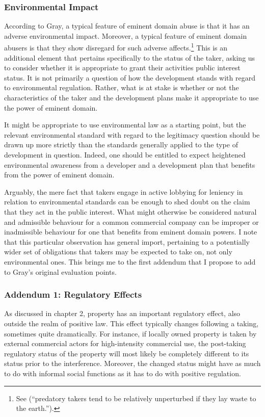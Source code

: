 \subsubsection*{Environmental Impact}

According to Gray, a typical feature of eminent domain abuse is that it has an adverse environmental impact. Moreover, a typical feature of eminent domain abusers is that they show disregard for such adverse affects.\footnote{See \cite[34]{gray11} (``predatory takers tend to be relatively unperturbed if they lay waste to the earth.'').} This is an additional element that pertains specifically to the status of the taker, asking us to consider whether it is appropriate to grant their activities public interest status. It is not primarily a question of how the development stands with regard to environmental regulation. Rather, what is at stake is whether or not the characteristics of the taker and the development plans make it appropriate to use the power of eminent domain. 

It might be appropriate to use environmental law as a starting point, but the relevant environmental standard with regard to the legitimacy question should be drawn up more strictly than the standards generally applied to the type of development in question. Indeed, one should be entitled to expect heightened environmental awareness from a developer and a development plan that benefits from the power of eminent domain.

Arguably, the mere fact that takers engage in active lobbying for leniency in relation to environmental standards can be enough to shed doubt on the claim that they act in the public interest. What might otherwise be considered natural and admissible behaviour for a common commercial company can be improper or inadmissible behaviour for one that benefits from eminent domain powers. I note that this particular observation has general import, pertaining to a potentially wider set of obligations that takers may be expected to take on, not only environmental ones. This brings me to the first addendum  that I propose to add to Gray's original evaluation points.

\subsubsection*{Addendum 1: Regulatory Effects}

As discussed in chapter 2, property has an important regulatory effect, also outside the realm of positive law. This effect typically changes following a taking, sometimes quite dramatically.  For instance, if locally owned property is taken by external commercial actors for high-intensity commercial use, the post-taking regulatory status of the property will most likely be completely different to its status prior to the interference. Moreover, the changed status might have as much to do with informal social functions as it has to do with positive regulation.

